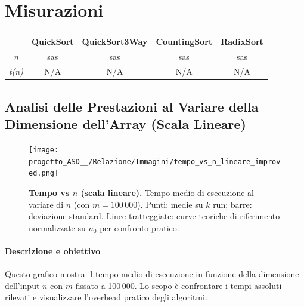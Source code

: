 \documentclass[a4paper, 11pt]{article}
\begin{document}
\section{Misurazioni}

\begin{table} [H]
    \centering
    \begin{tabular}{|c||c|c|c|c|}
        \hline
        & \textbf{QuickSort} & \textbf{QuickSort3Way} & \textbf{CountingSort} & \textbf{RadixSort}\\ [0.1 cm]
        \hline
        \textit{n} & sas & sas & sas & sas\\
        \hline
        \textit{t(n)} & N/A & N/A & N/A & N/A\\
        \hline
    \end{tabular}
\end{table}

\subsection{Analisi delle Prestazioni al Variare della Dimensione dell'Array (Scala Lineare)}
\begin{figure}[H]
    \centering
    \texttt{[image: progetto\_ASD\_\_/Relazione/Immagini/tempo\_vs\_n\_lineare\_improved.png]}
    \caption {\textbf{Tempo vs \(n\) (scala lineare).} Tempo medio di esecuzione al variare di \(n\) (con \(m=100\,000\)). Punti: medie su \(k\) run; barre: deviazione standard. Linee tratteggiate: curve teoriche di riferimento normalizzate su \(n_0\) per confronto pratico.}
    \label{fig:grafico}
\end{figure}

\paragraph{Descrizione e obiettivo}
Questo grafico mostra il tempo medio di esecuzione in funzione della dimensione dell'input \(n\) con \(m\) fissato a 100\,000. Lo scopo è confrontare i tempi assoluti rilevati e visualizzare l'overhead pratico degli algoritmi.
\end{document}

